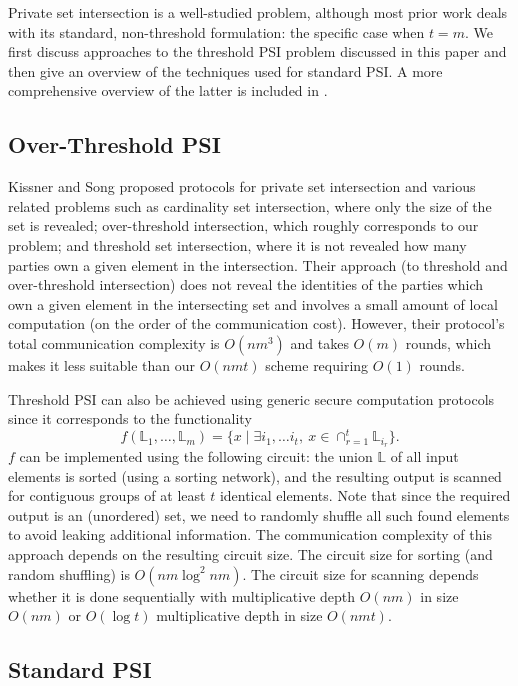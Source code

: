 Private set intersection is a well-studied problem, although most
prior work deals with its standard, non-threshold formulation: the
specific case when $t=m$. We first discuss approaches to the threshold
PSI problem discussed in this paper and then give an overview of the
techniques used for standard PSI. A more comprehensive overview of
the latter is included in \cite{Pinkas}.

\subsection{Over-Threshold PSI}

Kissner and Song \cite{Kissner} proposed protocols for private set
intersection and various related problems such as cardinality set
intersection, where only the size of the set is revealed; over-threshold
intersection, which roughly corresponds to our problem; and threshold
set intersection, where it is not revealed how many parties own a
given element in the intersection. Their approach (to threshold
and over-threshold intersection) does not reveal the identities of
the parties which own a given element in the intersecting set and
involves a small amount of local computation (on the order of the
communication cost). However, their protocol's total communication
complexity is $O(nm^{3})$ and takes $O(m)$ rounds, which makes it less suitable
than our $O(nmt)$ scheme requiring $O(1)$ rounds.

Threshold PSI can also be achieved using generic secure computation
protocols since it corresponds to the functionality 
\[
f(\mathbb{L}_{1},\ldots,\mathbb{L}_{m})=\{x\mid\exists i_{1},\ldots i_{t},\ x\in\cap_{r=1}^{t}\mathbb{L}_{i_{r}}\}.
\]
$f$ can be implemented using the following circuit: the union $\mathbb{L}$
of all input elements is sorted (using a sorting network), and the
resulting output is scanned for contiguous groups of at least $t$
identical elements. Note that since the required output is an (unordered)
set, we need to randomly shuffle all such found elements to avoid
leaking additional information. The communication complexity of this
approach depends on the resulting circuit size.  The circuit size for 
sorting (and random shuffling) is $O(nm\log^{2}nm)$. The circuit size for
scanning depends whether it is done sequentially with multiplicative depth
$O(nm)$ in size $O(nm)$ or $O(\log t)$ multiplicative depth in size $O(nmt)$.

\subsection{Standard PSI }

